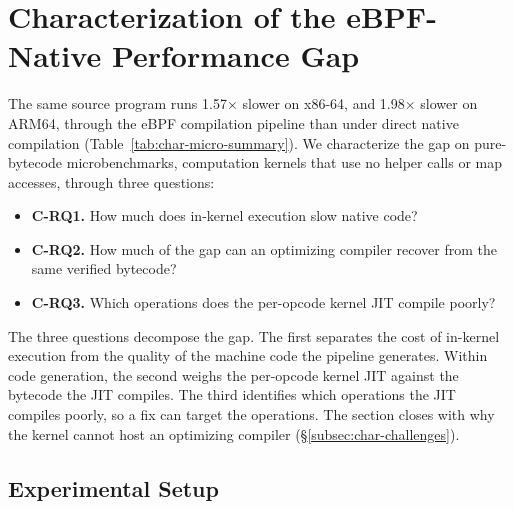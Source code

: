 
\section{Characterization of the eBPF-Native Performance Gap}
\label{sec:characterization}

The same source program runs 1.57$\times$ slower on x86-64, and 1.98$\times$ slower on ARM64, through the eBPF compilation pipeline than under direct native compilation (Table~\ref{tab:char-micro-summary}).
We characterize the gap on pure-bytecode microbenchmarks, computation kernels that use no helper calls or map accesses, through three questions:
\begin{itemize}
  \item \textbf{C-RQ1.} How much does in-kernel execution slow native code?
  \item \textbf{C-RQ2.} How much of the gap can an optimizing compiler recover from the same verified bytecode?
  \item \textbf{C-RQ3.} Which operations does the per-opcode kernel JIT compile poorly?
\end{itemize}

The three questions decompose the gap.
The first separates the cost of in-kernel execution from the quality of the machine code the pipeline generates.
Within code generation, the second weighs the per-opcode kernel JIT against the bytecode the JIT compiles.
The third identifies which operations the JIT compiles poorly, so a fix can target the operations.
The section closes with why the kernel cannot host an optimizing compiler (\S\ref{subsec:char-challenges}).

\subsection{Experimental Setup}
\label{subsec:char-method}

